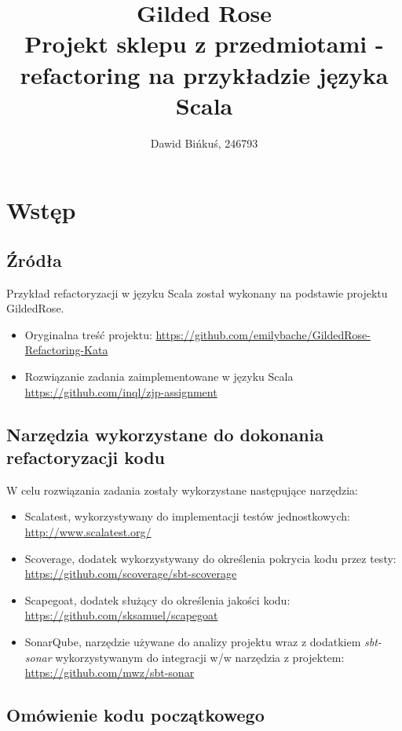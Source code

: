 \documentclass[a4paper, 11pt]{article}
\title{%
  Gilded Rose \\
  \large Projekt sklepu z przedmiotami - refactoring na przykładzie języka Scala}
\author{Dawid Bińkuś, 246793}
\begin{document}
\maketitle
\section{Wstęp}
\subsection{Źródła}
Przykład refactoryzacji w języku Scala został wykonany na podstawie projektu GildedRose.
\begin{itemize}
	\item Oryginalna treść projektu: \href{https://github.com/emilybache/GildedRose-Refactoring-Kata}{https://github.com/emilybache/GildedRose-Refactoring-Kata}
	\item Rozwiązanie zadania zaimplementowane w języku Scala \\\href{https://github.com/inql/zjp-assignment}{https://github.com/inql/zjp-assignment}
\end{itemize}
\subsection{Narzędzia wykorzystane do dokonania refactoryzacji kodu}
W celu rozwiązania zadania zostały wykorzystane następujące narzędzia:
\begin{itemize}
 \item Scalatest, wykorzystywany do implementacji testów jednostkowych: \href{http://www.scalatest.org/}{http://www.scalatest.org/}
 \item Scoverage, dodatek wykorzystywany do określenia pokrycia kodu przez testy:\\ \href{https://github.com/scoverage/sbt-scoverage}{https://github.com/scoverage/sbt-scoverage}
 \item Scapegoat, dodatek służący do określenia jakości kodu: \href{https://github.com/sksamuel/scapegoat}{https://github.com/sksamuel/scapegoat}
 \item SonarQube, narzędzie używane do analizy projektu wraz z dodatkiem \textit{sbt-sonar} wykorzystywanym do integracji w/w narzędzia z projektem: \href{https://github.com/mwz/sbt-sonar}{https://github.com/mwz/sbt-sonar}
\end{itemize}
\subsection{Omówienie kodu początkowego}
\end{document}
